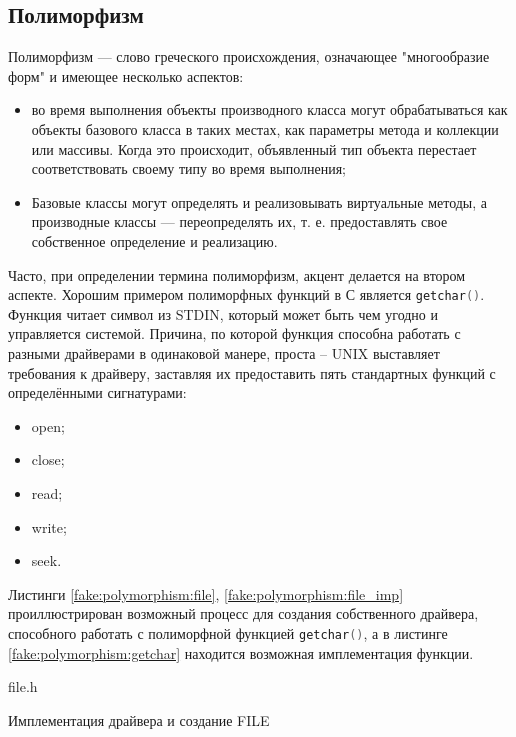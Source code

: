 \subsection{Полиморфизм}
\label{sec:polymorphism}

Полиморфизм — слово греческого происхождения, означающее "многообразие форм" и имеющее несколько аспектов\cite{microsoft:poly}:
\begin{itemize}
	\item во время выполнения объекты производного класса могут обрабатываться как объекты базового класса в таких местах, как параметры метода и коллекции или массивы. Когда это происходит, объявленный тип объекта перестает соответствовать своему типу во время выполнения;
	\item Базовые классы могут определять и реализовывать виртуальные методы, а производные классы — переопределять их, т. е. предоставлять свое собственное определение и реализацию.
\end{itemize}

Часто, при определении термина полиморфизм, акцент делается на втором аспекте. Хорошим примером полиморфных функций в С является \lstinline[language=C]{getchar()}. Функция читает символ из STDIN, который может быть чем угодно и управляется системой. Причина, по которой функция способна работать с разными драйверами в одинаковой манере, проста -- UNIX выставляет требования к драйверу, заставляя их предоставить пять стандартных функций с определёнными сигнатурами: 
\begin{itemize}
	\item open;
	\item close;
	\item read;
	\item write;
	\item seek.
\end{itemize}

Листинги \ref{fake:polymorphism:file}, \ref{fake:polymorphism:file_imp} проиллюстрирован возможный процесс для создания собственного драйвера, способного работать с полиморфной функцией \lstinline[language=C]{getchar()}, а в листинге \ref{fake:polymorphism:getchar} находится возможная имплементация функции.

\begin{code}
	
   \caption{file.h}
   \label{fake:polymorphism:file}
\end{code}

\begin{code}
	
   \caption{Имплементация драйвера и создание FILE}
   \label{fake:polymorphism:file_imp}
\end{code}

